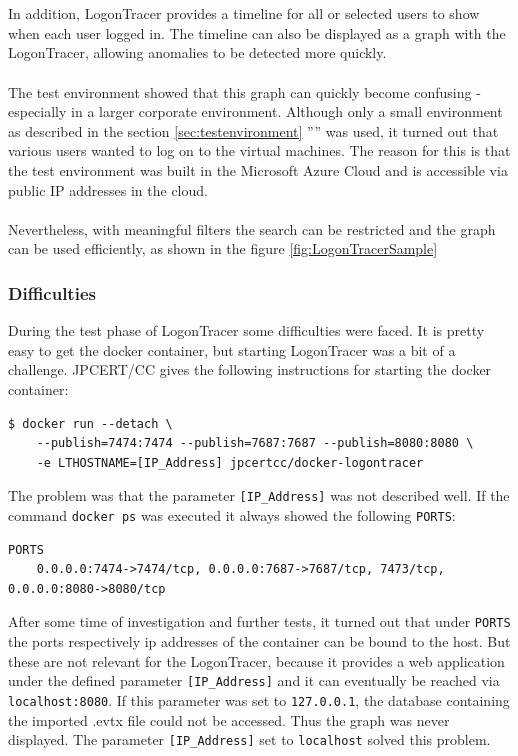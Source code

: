\\\\
In addition, LogonTracer provides a timeline for all or selected users to show when each user logged in. The timeline can also be displayed as a graph with the LogonTracer, allowing anomalies to be detected more quickly.
\\\\
The test environment showed that this graph can quickly become confusing - especially in a larger corporate environment. Although only a small environment as described in the section \ref{sec:testenvironment} '''' was used, it turned out that various users wanted to log on to the virtual machines. The reason for this is that the test environment was built in the Microsoft Azure Cloud and is accessible via public IP addresses in the cloud.
\\\\
Nevertheless, with meaningful filters the search can be restricted and the graph can be used efficiently, as shown in the figure \ref{fig:LogonTracerSample} 

\subsubsection{Difficulties}
During the test phase of LogonTracer some difficulties were faced. It is pretty easy to get the docker container, but starting LogonTracer was a bit of a challenge. JPCERT/CC gives the following instructions for starting the docker container:
\begin{lstlisting}[language=HTML,caption=LogonTracer: given docker run command]
    $ docker run --detach \
    --publish=7474:7474 --publish=7687:7687 --publish=8080:8080 \
    -e LTHOSTNAME=[IP_Address] jpcertcc/docker-logontracer
\end{lstlisting}
The problem was that the parameter \lstinline|[IP_Address]| was not described well. If the command \lstinline|docker ps| was executed it always showed the following \lstinline|PORTS|:
\begin{lstlisting}[caption=LogonTracer: docker ps (PORTS)]
    PORTS
    0.0.0.0:7474->7474/tcp, 0.0.0.0:7687->7687/tcp, 7473/tcp, 0.0.0.0:8080->8080/tcp
\end{lstlisting}
After some time of investigation and further tests, it turned out that under \lstinline|PORTS| the ports respectively ip addresses of the container can be bound to the host. But these are not relevant for the LogonTracer, because it provides a web application under the defined parameter \lstinline|[IP_Address]| and it can eventually be reached via \lstinline|localhost:8080|. If this parameter was set to \lstinline|127.0.0.1|, the database containing the imported .evtx file could not be accessed. Thus the graph was never displayed. The parameter \lstinline|[IP_Address]| set to \lstinline|localhost| solved this problem.

